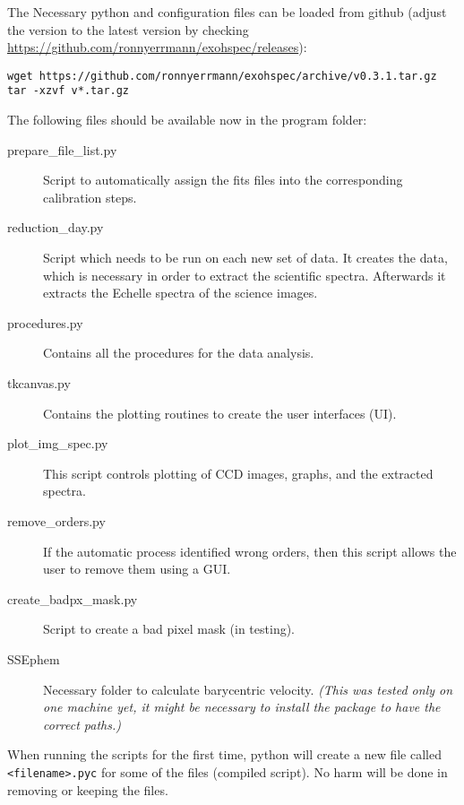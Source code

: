 \documentclass[10pt,a4paper]{article}
\begin{document}
\noindent The Necessary python and configuration files can be loaded from github (adjust the version to the latest version by checking \url{https://github.com/ronnyerrmann/exohspec/releases}):
\begin{lstlisting}[style=base]
wget https://github.com/ronnyerrmann/exohspec/archive/v0.3.1.tar.gz
tar -xzvf v*.tar.gz
\end{lstlisting}

\noindent The following files should be available now in the program folder:
\begin{description}
\item[prepare\_file\_list.py] Script to automatically assign the fits files into the corresponding calibration steps.
\item[reduction\_day.py] Script which needs to be run on each new set of data. It creates the data, which is necessary in order to extract the scientific spectra. Afterwards it extracts the Echelle spectra of the science images.
\item[procedures.py] Contains all the procedures for the data analysis.
\item[tkcanvas.py] Contains the plotting routines to create the user interfaces (UI).
\item[plot\_img\_spec.py] This script controls plotting of CCD images, graphs, and the extracted spectra.
\item[remove\_orders.py] If the automatic process identified wrong orders, then this script allows the user to remove them using a GUI.
\item[create\_badpx\_mask.py] Script to create a bad pixel mask (in testing).
\item[SSEphem] Necessary folder to calculate barycentric velocity. \textit{(This was tested only on one machine yet, it might be necessary to install the package to have the correct paths.)}
\end{description}

When running the scripts for the first time, python will create a new file called \verb|<filename>.pyc| for some of the files (compiled script). No harm will be done in removing or keeping the files.
\end{document}
